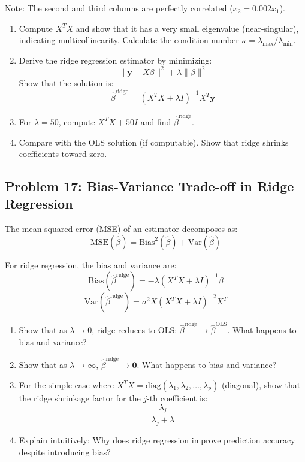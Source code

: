 \documentclass[12pt]{article}
\begin{document}
Note: The second and third columns are perfectly correlated (\(x_2 = 0.002 x_1\)).

\begin{enumerate}[label=(\alph*)]
\item Compute \(X^TX\) and show that it has a very small eigenvalue (near-singular), indicating multicollinearity. Calculate the condition number \(\kappa = \lambda_{\max}/\lambda_{\min}\).

\item Derive the ridge regression estimator by minimizing:
\[
\|\mathbf{y} - X\beta\|^2 + \lambda\|\beta\|^2
\]
Show that the solution is:
\[
\hat{\beta}^{\text{ridge}} = (X^TX + \lambda I)^{-1}X^T\mathbf{y}
\]

\item For \(\lambda = 50\), compute \(X^TX + 50I\) and find \(\hat{\beta}^{\text{ridge}}\).

\item Compare with the OLS solution (if computable). Show that ridge shrinks coefficients toward zero.
\end{enumerate}

\subsection*{Problem 17: Bias-Variance Trade-off in Ridge Regression}

The mean squared error (MSE) of an estimator decomposes as:
\[
\text{MSE}(\hat{\beta}) = \text{Bias}^2(\hat{\beta}) + \text{Var}(\hat{\beta})
\]

For ridge regression, the bias and variance are:
\[
\text{Bias}(\hat{\beta}^{\text{ridge}}) = -\lambda(X^TX + \lambda I)^{-1}\beta
\]
\[
\text{Var}(\hat{\beta}^{\text{ridge}}) = \sigma^2 X(X^TX + \lambda I)^{-2}X^T
\]

\begin{enumerate}[label=(\alph*)]
\item Show that as \(\lambda \to 0\), ridge reduces to OLS: \(\hat{\beta}^{\text{ridge}} \to \hat{\beta}^{\text{OLS}}\). What happens to bias and variance?

\item Show that as \(\lambda \to \infty\), \(\hat{\beta}^{\text{ridge}} \to \mathbf{0}\). What happens to bias and variance?

\item For the simple case where \(X^TX = \text{diag}(\lambda_1, \lambda_2, \ldots, \lambda_p)\) (diagonal), show that the ridge shrinkage factor for the \(j\)-th coefficient is:
\[
\frac{\lambda_j}{\lambda_j + \lambda}
\]

\item Explain intuitively: Why does ridge regression improve prediction accuracy despite introducing bias?
\end{enumerate}
\end{document}
